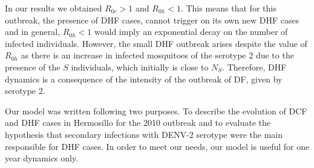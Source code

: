         In our results we obtained $R_{0c}>1$ and  $R_{0h}<1$. This means
    that for this outbreak, the presence of DHF cases, cannot trigger
    on its own new DHF cases and in general, $R_{0h}<1$ would imply an
    exponential decay on the number of infected individuals. However,
    the small DHF outbreak arises despite the value of $R_{0h}$ as
    there is an increase in infected mosquitoes of the serotype 2 due
    to the presence of the $S$ individuals, which initially is close
    to $N_S$. Therefore, DHF dynamics is a consequence of the
    intensity of the outbreak of DF, given by serotype 2.

\noindent Our model was written following two purposes. To describe the evolution of DCF and DHF
cases in Hermosillo for the 2010 outbreak and to evaluate the hypothesis that secondary infections
with DENV-2 serotype were the main responsible for DHF cases. In order to meet our needs, our model is useful for one year dynamics only.